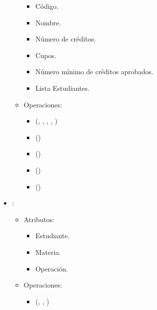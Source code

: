 \documentclass[11pt]{article}
\begin{document}
\begin{itemize}
\begin{itemize}
         \begin{itemize}
            \item Código.
            \item Nombre.
            \item Número de créditos.
            \item Cupos.
            \item Número mínimo de créditos aprobados.
            \item Lista Estudiantes.
         \end{itemize}
      \end{itemize}
      
      \begin{itemize}
         \item Operaciones:
         
         \begin{itemize}
            \item {}(, , , , )
            \item {}()
            \item {}()
            \item {}()
            \item {}()
         \end{itemize}
      \end{itemize}


      \item {}:
      \begin{itemize}
         \item Atributos:

         \begin{itemize}
            \item Estudiante.
            \item Materia.
            \item Operación.
         \end{itemize}
      \end{itemize}

      \begin{itemize}
         \item Operaciones:
         
         \begin{itemize}
            \item {}(, , )
         \end{itemize}
      \end{itemize}
      
   \end{itemize}
\end{document}
